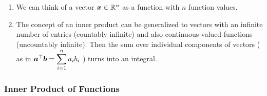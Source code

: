 \begin{enumerate}
    \item We can think of a vector $\bm{x} \in \mathbb{R}^n$ as a function with $n$ function values.
    \hfill \cite{mfml/book/mml/Deisenroth-Faisal-Ong}

    \item The concept of an inner product can be generalized to vectors with an infinite number of entries (countably infinite) and also continuous-valued functions (uncountably infinite).
    Then the sum over individual components of vectors ( as in $\bm{a}^\top \bm{b} = \displaystyle\sum^n_{i=1} a_i b_i$ ) turns into an integral.
    \hfill \cite{mfml/book/mml/Deisenroth-Faisal-Ong}


\end{enumerate}




\subsubsection{Inner Product of Functions}


